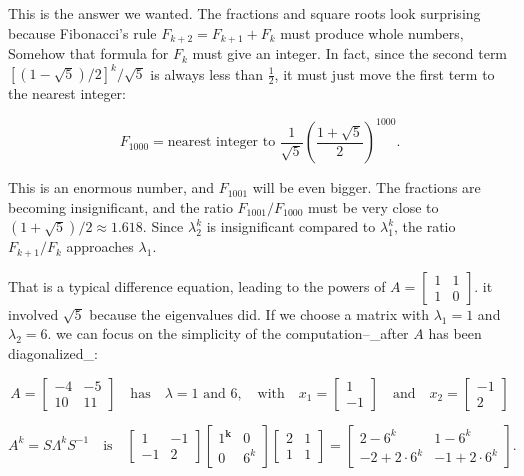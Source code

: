This is the answer we wanted. The fractions and square roots look surprising because Fibonacci's rule \(F_{k+2}=F_{k+1}+F_{k}\) must produce whole numbers, Somehow that formula for \(F_{k}\) must give an integer. In fact, since the second term \([(1-\sqrt{5})/2]^{k}/\sqrt{5}\) is always less than \(\frac{1}{2}\), it must just move the first term to the nearest integer:

\[F_{1000}=\text{nearest integer to }\frac{1}{\sqrt{5}}\left(\frac{1+\sqrt{5}}{2} \right)^{1000}.\]

This is an enormous number, and \(F_{1001}\) will be even bigger. The fractions are becoming insignificant, and the ratio \(F_{1001}/F_{1000}\) must be very close to \((1+\sqrt{5})/2\approx 1.618\). Since \(\lambda_{2}^{k}\) is insignificant compared to \(\lambda_{1}^{k}\), the ratio \(F_{k+1}/F_{k}\) approaches \(\lambda_{1}\).

That is a typical difference equation, leading to the powers of \(A=\begin{bmatrix}1&1\\ 1&0\end{bmatrix}\). it involved \(\sqrt{5}\) because the eigenvalues did. If we choose a matrix with \(\lambda_{1}=1\) and \(\lambda_{2}=6\). we can focus on the simplicity of the computation--_after \(A\) has been diagonalized_:

\[A=\begin{bmatrix}-4&-5\\ 10&11\end{bmatrix}\quad\text{has}\quad\lambda=1\text{ and }6,\quad\text{with}\quad x_{1}= \begin{bmatrix}1\\ -1\end{bmatrix}\quad\text{and}\quad x_{2}=\begin{bmatrix}-1\\ 2\end{bmatrix}\]

\[A^{k}=S\Lambda^{k}S^{-1}\quad\text{is}\quad\begin{bmatrix}1&-1\\ -1&2\end{bmatrix}\begin{bmatrix}1^{\boldsymbol{k}}&0\\ 0&6^{k}\end{bmatrix}\begin{bmatrix}2&1\\ 1&1\end{bmatrix}=\begin{bmatrix}2-6^{k}&1-6^{k}\\ -2+2\cdot 6^{k}&-1+2\cdot 6^{k}\end{bmatrix}.\] 